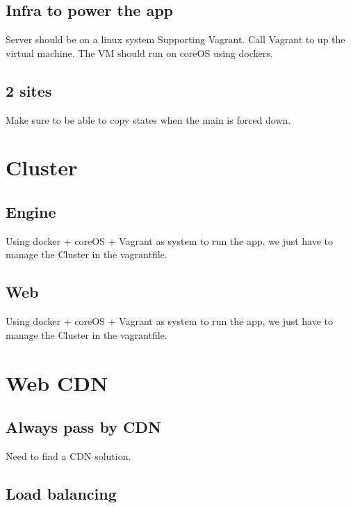 \documentclass[a4paper,10pt]{report}
\begin{document}
    \section{Infra to power the app}
      Server should be on a linux system Supporting Vagrant. Call Vagrant to up the virtual machine. The VM should run on coreOS using dockers.
    \section{2 sites}
      Make sure to be able to copy states when the main is forced down.
  \chapter{Cluster}
    \section{Engine}
      Using docker + coreOS + Vagrant as system to run the app, we just have to manage the Cluster in the vagrantfile.
    \section{Web}
      Using docker + coreOS + Vagrant as system to run the app, we just have to manage the Cluster in the vagrantfile.
  \chapter{Web CDN}
    \section{Always pass by CDN}
     Need to find a CDN solution.
    \section{Load balancing}
\end{document}
